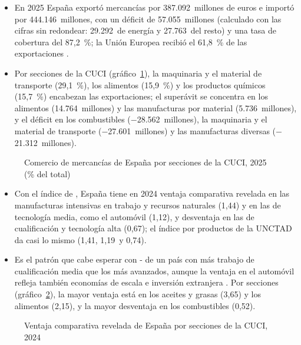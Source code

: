 \documentclass[11pt]{article}
\begin{document}
\begin{itemize}
\item En 2025 España exportó mercancías por 387.092~millones de euros e importó por 444.146~millones, con un déficit de 57.055~millones (calculado con las cifras sin redondear: 29.292~de energía y 27.763~del resto) y una tasa de cobertura del 87,2~\%; la Unión Europea recibió el 61,8~\% de las exportaciones\nocite{MINECO2026InformeDic2025} .
\item Por secciones de la CUCI (gráfico~\ref{fig:comercio-sectores-espana}), la maquinaria y el material de transporte (29,1~\%), los alimentos (15,9~\%) y los productos químicos (15,7~\%) encabezan las exportaciones; el superávit se concentra en los alimentos (14.764~millones) y las manufacturas por material (5.736~millones), y el déficit en los combustibles ($-$28.562~millones), la maquinaria y el material de transporte ($-$27.601~millones) y las manufacturas diversas ($-$21.312~millones)\nocite{Datacomex2026}.
\end{itemize}
\begin{figure}[H]
\centering
\caption{Comercio de mercancías de España por secciones de la CUCI, 2025 (\% del total)}\label{fig:comercio-sectores-espana}
\end{figure}
\begin{itemize}

\item Con el índice de \textcite{Balassa1965Trade}, España tiene en 2024 ventaja comparativa revelada en las manufacturas intensivas en trabajo y recursos naturales (1,44) y en las de tecnología media, como el automóvil (1,12), y desventaja en las de cualificación y tecnología alta (0,67)\nocite{UNComtrade2026,UNCTAD2026Intensidad}; el índice por productos de la UNCTAD da casi lo mismo (1,41, 1,19~y 0,74)\nocite{UNCTAD2026RCA}.
\item Es el patrón que cabe esperar con - de un país con más trabajo de cualificación media que los más avanzados, aunque la ventaja en el automóvil refleja también economías de escala e inversión extranjera . Por secciones (gráfico~\ref{fig:vcr-secciones-cuci-espana}), la mayor ventaja está en los aceites y grasas (3,65) y los alimentos (2,15), y la mayor desventaja en los combustibles (0,52).
\end{itemize}
\begin{figure}[H]
\centering
\caption{Ventaja comparativa revelada de España por secciones de la CUCI, 2024}\label{fig:vcr-secciones-cuci-espana}
\end{figure}
\end{document}
